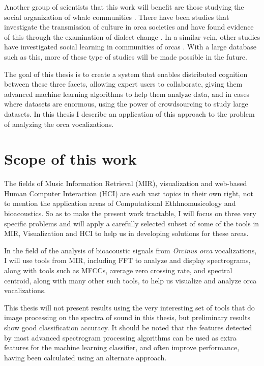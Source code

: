 Another group of scientists that this work will benefit are those
studying the social organization of whale communities
\cite{bigg1990orca} \cite{deecke2000dialect}
\cite{thomsen2002significance} \cite{weiss2006vocal}
\cite{weiss2007intra}.  There have been studies that investigate the
transmission of culture \cite{rendell2001culture} in orca societies
\cite{deecke2000dialect} and have found evidence of this through the
examination of dialect change \cite{riesch2006stability}.  In a
similar vein, other studies have investigated social learning
\cite{janik2000social} in communities of orcas \cite{weiss2007intra}.
With a large database such as this, more of these type of studies will
be made possible in the future.

The goal of this thesis is to create a system that enables distributed
cognition between these three facets, allowing expert users to
collaborate, giving them advanced machine learning algorithms to help
them analyze data, and in cases where datasets are enormous, using the
power of crowdsourcing \cite{surowiecki05crowdsourcing} to study large
datasets.  In this thesis I describe an application of this approach
to the problem of analyzing the orca vocalizations.

%
%
\section{Scope of this work}
\label{section:introduction:scopeOfThisWork}

The fields of Music Information Retrieval (MIR), visualization and
web-based Human Computer Interaction (HCI) are each vast topics in
their own right, not to mention the application areas of Computational
Ethhnomusicology\cite{tzanetakis2008ce} and bioacoustics.  So as to
make the present work tractable, I will focus on three very specific
problems and will apply a carefully selected subset of some of the
tools in MIR, Visualization and HCI to help us in developing solutions
for these areas.

In the field of the analysis of bioacoustic signals from
\textit{Orcinus orca} vocalizations, I will use tools from MIR,
including FFT to analyze and display spectrograms, along with tools
such as MFCCs, average zero crossing rate, and spectral centroid,
along with many other such tools, to help us visualize and analyze
orca vocalizations.

This thesis will not present results using the very interesting set of
tools that do image processing on the spectra of sound in this thesis,
but preliminary results show good classification accuracy.  It should
be noted that the features detected by most advanced spectrogram
processing algorithms can be used as extra features for the machine
learning classifier, and often improve performance, having been
calculated using an alternate approach.

